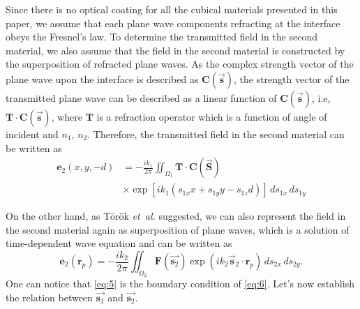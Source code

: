 \documentclass[9pt,twocolumn,twoside]{osajnl}
\begin{document}
Since there is no optical coating for all the cubical materials presented in this paper, we assume that each plane wave components refracting at the interface obeys the Fresnel's law. To determine the transmitted field in the second material, we also assume that the field in the second material is constructed by the superposition of refracted plane waves. As the complex strength vector of the plane wave upon the interface is described as $\textbf{C}(\vec{\textbf{s}})$, the strength vector of the transmitted plane wave can be described as a linear function of $\textbf{C}(\vec{\textbf{s}})$, i.e, $\textbf{T}\cdot\textbf{C}(\vec{\textbf{s}})$, where $\mathbf{T}$ is a refraction operator which is a function of angle of incident and $n_1$, $n_2$. Therefore, the transmitted field in the second material can be written as
\begin{equation}\label{eq:5}
	\begin{aligned}
		\textbf{e}_2(x,y,-d)&=-\frac{ik_1}{2\pi}\iint_{\Omega_1}\textbf{T}\cdot\textbf{C}(\vec{\textbf{S}})\\
		&\times\exp[ik_1(s_{1x}x+s_{1y}y-s_{1z}d)]\,ds_{1x}\,ds_{1y}		
	\end{aligned}
\end{equation}

On the other hand, as T\"or\"ok \emph{et~al.} \cite{torok1995electromagnetic} suggested, we can also represent the field in the second material again as superposition of plane waves, which is a solution of time-dependent wave equation and can be written as
\begin{equation}\label{eq:6}
	\textbf{e}_2(\textbf{r}_p)=-\frac{ik_2}{2\pi}\iint_{\Omega_2}\textbf{F}(\vec{\mathbf{s}_2})\exp(ik_2\vec{\textbf{s}}_2\cdot\mathbf{r}_p)\,ds_{2x}\,ds_{2y}.
\end{equation}
One can notice that \eqref{eq:5} is the boundary condition of \eqref{eq:6}. Let's now establish the relation between $\vec{\textbf{s}_1}$ and $\vec{\textbf{s}_2}$.
\end{document}
